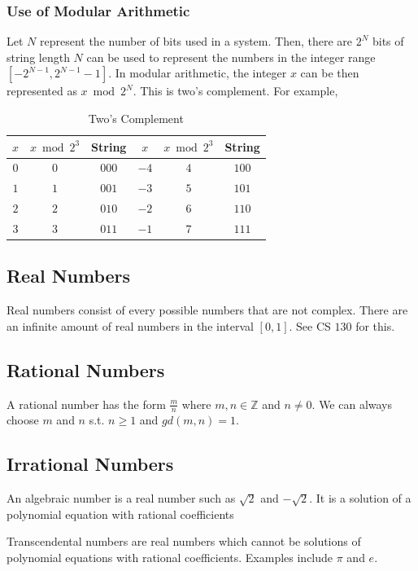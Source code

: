 \documentclass[a4paper]{article}
\theoremstyle{plain}
\theoremstyle{definition}
\newtheorem{defn}{Definition}[section]
\newtheorem{exmp}{Example}[section]
\theoremstyle{remark}
\begin{document}
\subsubsection{Use of Modular Arithmetic}
Let $N$ represent the number of bits used in a system. Then, there are $2^{N}$ bits of string length $N$ can be used to represent the numbers in the integer range $[-2^{N-1},2^{N-1}-1]$. In modular arithmetic, the integer $x$ can be then represented as $x \bmod 2^{N}$. This is two's complement. For example,
\begin{tcolorbox}[colback=black!3!white,colframe=black!60!white,title=\begin{exmp}Two's Complement \label{}\end{exmp}]
        
\begin{table}[H]
	\centering
	\caption{Two's Complement}
	\label{tab:two}
	\begin{tabular}{|c|c|c|c|c|c|}
		\hline
	$x$ & $x \bmod 2^{3}$ & String & $x$ & $x \bmod 2^{3}$ & String  \\
	\hline
	$0$ & $0$ & $000$ & $-4$ &$4$ & $100$ \\
	$1$ & $ 1$ & $ 001$ & $-3$ & $5$ & $101$ \\
	$2$ & $2$ & $010$ & $-2$ & $6$ & $110$ \\
	$3$ & $3$ & $ 011$ & $-1$ & $7$& $111$ \\
	\hline
	\end{tabular}
\end{table}
\end{tcolorbox}
\subsection{Real Numbers}
Real numbers consist of every possible numbers that are not complex. There are an infinite amount of real numbers in the interval $[0,1]$. See CS $130$ for this.
\subsection{Rational Numbers}
A rational number has the form $\frac{m}{n}$ where $m,n \in \mathbb{Z}$ and $n \neq 0$. We can always choose $ m$ and $n$ s.t. $n \ge 1$ and $gd(m,n)=1$.
\subsection{Irrational Numbers}
An algebraic number is a real number such as  $\sqrt{2}$ and $-\sqrt{2}  $. It is a solution of a polynomial equation with rational coefficients
\begin{tcolorbox}[colback=black!3!white,colframe=black!60!white,title=\begin{defn}Transcendental numbers \label{Transcendental numbers}\end{defn}]
Transcendental numbers are real numbers which cannot be solutions of polynomial equations with rational coefficients. Examples include $\pi$ and $e$.
\end{tcolorbox}
\end{document}
